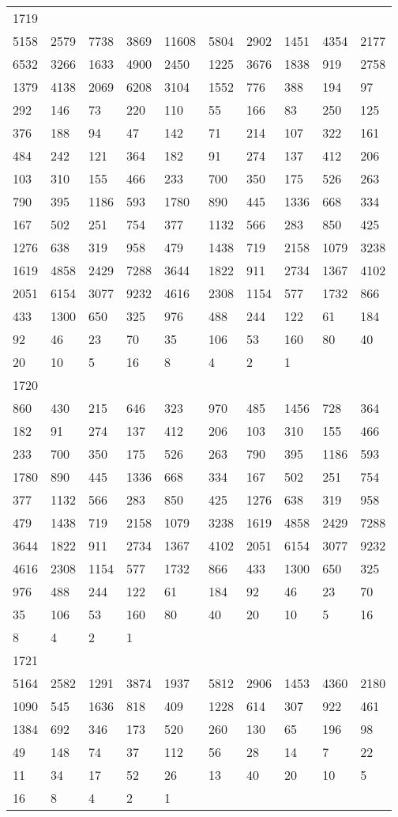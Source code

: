 \begin{longtable}{*{10}{l}}
1719&&&&&&&&&\\
5158& 2579& 7738& 3869& 11608& 5804& 2902& 1451& 4354& 2177\\
6532& 3266& 1633& 4900& 2450& 1225& 3676& 1838& 919& 2758\\
1379& 4138& 2069& 6208& 3104& 1552& 776& 388& 194& 97\\
292& 146& 73& 220& 110& 55& 166& 83& 250& 125\\
376& 188& 94& 47& 142& 71& 214& 107& 322& 161\\
484& 242& 121& 364& 182& 91& 274& 137& 412& 206\\
103& 310& 155& 466& 233& 700& 350& 175& 526& 263\\
790& 395& 1186& 593& 1780& 890& 445& 1336& 668& 334\\
167& 502& 251& 754& 377& 1132& 566& 283& 850& 425\\
1276& 638& 319& 958& 479& 1438& 719& 2158& 1079& 3238\\
1619& 4858& 2429& 7288& 3644& 1822& 911& 2734& 1367& 4102\\
2051& 6154& 3077& 9232& 4616& 2308& 1154& 577& 1732& 866\\
433& 1300& 650& 325& 976& 488& 244& 122& 61& 184\\
92& 46& 23& 70& 35& 106& 53& 160& 80& 40\\
20& 10& 5& 16& 8& 4& 2& 1& \\

1720&&&&&&&&&\\
860& 430& 215& 646& 323& 970& 485& 1456& 728& 364\\
182& 91& 274& 137& 412& 206& 103& 310& 155& 466\\
233& 700& 350& 175& 526& 263& 790& 395& 1186& 593\\
1780& 890& 445& 1336& 668& 334& 167& 502& 251& 754\\
377& 1132& 566& 283& 850& 425& 1276& 638& 319& 958\\
479& 1438& 719& 2158& 1079& 3238& 1619& 4858& 2429& 7288\\
3644& 1822& 911& 2734& 1367& 4102& 2051& 6154& 3077& 9232\\
4616& 2308& 1154& 577& 1732& 866& 433& 1300& 650& 325\\
976& 488& 244& 122& 61& 184& 92& 46& 23& 70\\
35& 106& 53& 160& 80& 40& 20& 10& 5& 16\\
8& 4& 2& 1& \\

1721&&&&&&&&&\\
5164& 2582& 1291& 3874& 1937& 5812& 2906& 1453& 4360& 2180\\
1090& 545& 1636& 818& 409& 1228& 614& 307& 922& 461\\
1384& 692& 346& 173& 520& 260& 130& 65& 196& 98\\
49& 148& 74& 37& 112& 56& 28& 14& 7& 22\\
11& 34& 17& 52& 26& 13& 40& 20& 10& 5\\
16& 8& 4& 2& 1& \\


\end{longtable}
